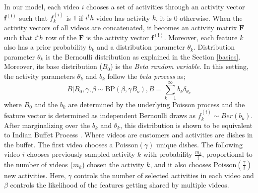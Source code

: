 In our model, each video $i$ chooses a set of activities through an activity vector $\mathbf{f^{(i)}}$ such that $f^{(i)}_k$ is $1$ if $i^th$ video has activity $k$, it is 0 otherwise. When the activity vectors of all videos are concatenated, it becomes an activity matrix $\mathbf{F}$ such that $i^th$ row of the $\mathbf{F}$ is the activity vector $\mathbf{f^{(i)}}$. Moreover, each feature $k$ also has a prior probability $b_k$  and a distribution parameter $\theta_k$. Distribution parameter $\theta_k$ is the Bernoulli distribution as explained in the Section \ref{basics}. Moreover, its base distribution ($B_0$) is the \emph{Beta random variable}. In this setting, the activity parameters $\theta_k$ and $b_k$ follow the \emph{beta process} as;
\begin{equation}
  B|B_0,\gamma,\beta \sim \text{BP}(\beta,\gamma B_o), B=\sum_{k=1}^\infty b_k \delta_{\theta_k}
\end{equation}
where $B_0$ and the $b_k$ are determined by the underlying Poisson process \cite{ibp} and the feature vector is determined as independent Bernoulli draws as $f_{k}^{(i)} \sim Ber(b_k)$. After marginalizing over the $b_k$ and $\theta_k$, this distribution is shown to be equivalent to Indian Buffet Process \cite{ibp}. Where videos are customers and activities are dishes in the buffet. The first video chooses a $\text{Poisson}(\gamma)$ unique dishes. The following video $i$ chooses previously sampled activity $k$ with probability $\frac{m_k}{i}$,  proportional to the number of videos ($m_k$) chosen the activity $k$, and it also chooses $\text{Poisson}(\frac{\gamma}{i})$ new activities. Here, $\gamma$ controls the number of selected activities in each video and $\beta$ controls the likelihood of the features getting shared by multiple videos.

